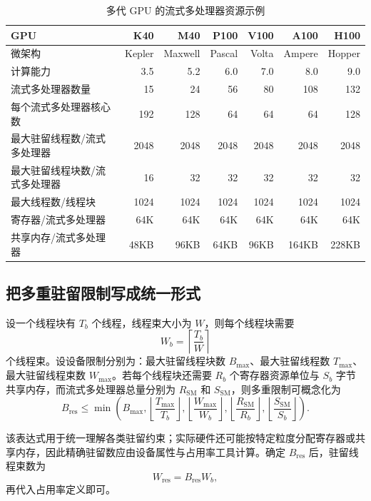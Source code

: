 \begin{table}[H]
\centering
\small
\setlength{\tabcolsep}{4pt}
\begin{tabularx}{\textwidth}{>{\raggedright\arraybackslash}Xrrrrrr}
\toprule
GPU & K40 & M40 & P100 & V100 & A100 & H100 \\
\midrule
微架构 & Kepler & Maxwell & Pascal & Volta & Ampere & Hopper \\
计算能力 & 3.5 & 5.2 & 6.0 & 7.0 & 8.0 & 9.0 \\
流式多处理器数量 & 15 & 24 & 56 & 80 & 108 & 132 \\
每个流式多处理器核心数 & 192 & 128 & 64 & 64 & 64 & 128 \\
最大驻留线程数/流式多处理器 & 2048 & 2048 & 2048 & 2048 & 2048 & 2048 \\
最大驻留线程块数/流式多处理器 & 16 & 32 & 32 & 32 & 32 & 32 \\
最大线程数/线程块 & 1024 & 1024 & 1024 & 1024 & 1024 & 1024 \\
寄存器/流式多处理器 & 64K & 64K & 64K & 64K & 64K & 64K \\
共享内存/流式多处理器 & 48KB & 96KB & 64KB & 96KB & 164KB & 228KB \\
\bottomrule
\end{tabularx}
\caption{多代 GPU 的流式多处理器资源示例}
\end{table}

\subsection{把多重驻留限制写成统一形式}

设一个线程块有 \(T_b\) 个线程，线程束大小为 \(W\)，则每个线程块需要
\[
W_b=\left\lceil\frac{T_b}{W}\right\rceil
\]
个线程束。设设备限制分别为：最大驻留线程块数 \(B_{\max}\)、最大驻留线程数 \(T_{\max}\)、最大驻留线程束数 \(W_{\max}\)。若每个线程块还需要 \(R_b\) 个寄存器资源单位与 \(S_b\) 字节共享内存，而流式多处理器总量分别为 \(R_{\mathrm{SM}}\) 和 \(S_{\mathrm{SM}}\)，则多重限制可概念化为
\[
B_{\mathrm{res}}
\le
\min\left(
B_{\max},
\left\lfloor\frac{T_{\max}}{T_b}\right\rfloor,
\left\lfloor\frac{W_{\max}}{W_b}\right\rfloor,
\left\lfloor\frac{R_{\mathrm{SM}}}{R_b}\right\rfloor,
\left\lfloor\frac{S_{\mathrm{SM}}}{S_b}\right\rfloor
\right).
\]

该表达式用于统一理解各类驻留约束；实际硬件还可能按特定粒度分配寄存器或共享内存，因此精确驻留数应由设备属性与占用率工具计算。确定 \(B_{\mathrm{res}}\) 后，驻留线程束数为
\[
W_{\mathrm{res}}=B_{\mathrm{res}}W_b,
\]
再代入占用率定义即可。

